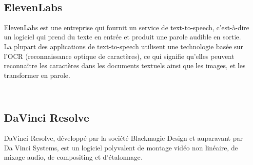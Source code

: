 \documentclass[11,5pt]{report}
\begin{document}
\begin{spacing}{2}
\begin{minipage}{\linewidth}
	\label{f3}%
\end{minipage}\\

\subsection{ElevenLabs}\label{sec:El}
ElevenLabs\cite{ElevenLabs} est une entreprise qui fournit un service de text-to-speech, c'est-à-dire un logiciel qui prend du texte en entrée et produit une parole audible en sortie. La plupart des applications de text-to-speech utilisent une technologie basée sur l'OCR (reconnaissance optique de caractères), ce qui signifie qu'elles peuvent reconnaître les caractères dans les documents textuels ainsi que les images, et les transformer en parole.  \newline


\begin{minipage}{\linewidth}
	\label{f3}%
\end{minipage}\\
\subsection{DaVinci Resolve}\label{sec:dav}
DaVinci Resolve, développé par la société Blackmagic Design et auparavant par Da Vinci Systems, est un logiciel polyvalent de montage vidéo non linéaire, de mixage audio, de compositing et d'étalonnage. 


\end{spacing}
\end{document}
